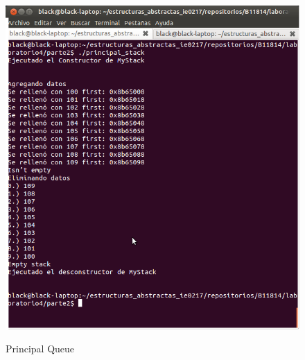 \documentclass{article}
\begin{document}
\begin{figure}[H]
\caption{Principal Queue}
\includegraphics[scale=0.6]{./imagenes/principalstack.png}
\label{fig:principalstack}
\end{figure}
\end{document}
